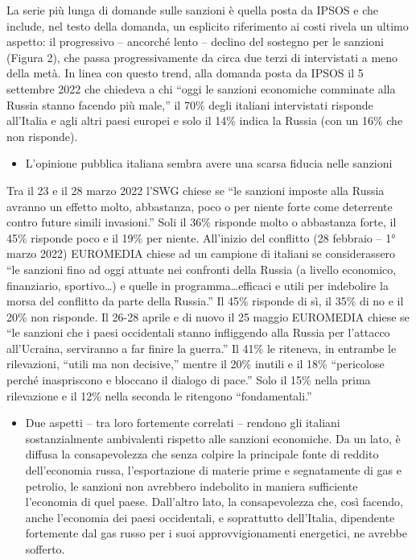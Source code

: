 \documentclass[
]{book}
\providecommand{\tightlist}{%
  \setlength{\itemsep}{0pt}\setlength{\parskip}{0pt}}
\begin{document}
La serie più lunga di domande sulle sanzioni è quella posta da IPSOS e che include, nel testo della domanda, un esplicito riferimento ai costi rivela un ultimo aspetto: il progressivo -- ancorché lento -- declino del sostegno per le sanzioni (Figura 2), che passa progressivamente da circa due terzi di intervistati a meno della metà. In linea con questo trend, alla domanda posta da IPSOS il 5 settembre 2022 che chiedeva a chi ``oggi le sanzioni economiche comminate alla Russia stanno facendo più male,'' il 70\% degli italiani intervistati risponde all'Italia e agli altri paesi europei e solo il 14\% indica la Russia (con un 16\% che non risponde).

\begin{itemize}
\tightlist
\item
  L'opinione pubblica italiana sembra avere una scarsa fiducia nelle sanzioni
\end{itemize}

Tra il 23 e il 28 marzo 2022 l'SWG chiese se ``le sanzioni imposte alla Russia avranno un effetto molto, abbastanza, poco o per niente forte come deterrente contro future simili invasioni.'' Soli il 36\% risponde molto o abbastanza forte, il 45\% risponde poco e il 19\% per niente. All'inizio del conflitto (28 febbraio -- 1° marzo 2022) EUROMEDIA chiese ad un campione di italiani se considerassero ``le sanzioni fino ad oggi attuate nei confronti della Russia (a livello economico, finanziario, sportivo\ldots) e quelle in programma\ldots efficaci e utili per indebolire la morsa del conflitto da parte della Russia.'' Il 45\% risponde di sì, il 35\% di no e il 20\% non risponde. Il 26-28 aprile e di nuovo il 25 maggio EUROMEDIA chiese se ``le sanzioni che i paesi occidentali stanno infliggendo alla Russia per l'attacco all'Ucraina, serviranno a far finire la guerra.'' Il 41\% le riteneva, in entrambe le rilevazioni, ``utili ma non decisive,'' mentre il 20\% inutili e il 18\% ``pericolose perché inaspriscono e bloccano il dialogo di pace.'' Solo il 15\% nella prima rilevazione e il 12\% nella seconda le ritengono ``fondamentali.''

\begin{itemize}
\tightlist
\item
  Due aspetti -- tra loro fortemente correlati -- rendono gli italiani sostanzialmente ambivalenti rispetto alle sanzioni economiche. Da un lato, è diffusa la consapevolezza che senza colpire la principale fonte di reddito dell'economia russa, l'esportazione di materie prime e segnatamente di gas e petrolio, le sanzioni non avrebbero indebolito in maniera sufficiente l'economia di quel paese. Dall'altro lato, la consapevolezza che, così facendo, anche l'economia dei paesi occidentali, e soprattutto dell'Italia, dipendente fortemente dal gas russo per i suoi approvvigionamenti energetici, ne avrebbe sofferto.
\end{itemize}
\end{document}
